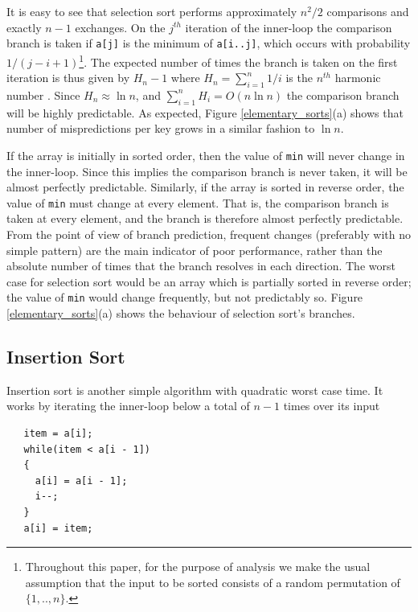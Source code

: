 \documentclass[acmtocl]{acmtrans2m}
\begin{document}
It is easy to see that selection sort performs approximately $n^2/2$ comparisons
and exactly $n - 1$ exchanges.  On the $j^{th}$ iteration of the inner-loop the
comparison branch is taken if \texttt{a[j]} is the minimum of \texttt{a[i..j]},
which occurs with probability $1 / (j - i + 1)$\footnote{Throughout this paper,
for the purpose of analysis we make the usual assumption that the input to be
sorted consists of a random permutation of $\lbrace1, .., n\rbrace$.}.  The
expected number of times the branch is taken on the first iteration is thus
given by $H_n - 1$ where $H_n = \sum_{i = 1}^n 1/i$ is the $n^{th}$ harmonic
number \cite{KnuthVol1_97}.  Since $H_n \approx \ln n$, and 
$\sum_{i = 1}^n H_i = O(n \ln n)$ the comparison branch will be highly
predictable. As expected, Figure \ref{elementary_sorts}(a) shows that number of
mispredictions per key grows in a similar fashion to $\ln n$.

If the array is initially in sorted order, then the value of \texttt{min} will
never change in the inner-loop. Since this implies the comparison branch is
never taken, it will be almost perfectly predictable. Similarly, if the array is
sorted in reverse order, the value of \texttt{min} must change at every element.
That is, the comparison branch is taken at every element, and the branch is
therefore almost perfectly predictable.  From the point of view of branch
prediction, frequent changes (preferably with no simple pattern) are the main
indicator of poor performance, rather than the absolute number of times that the
branch resolves in each direction. The worst case for selection sort would be an
array which is partially sorted in reverse order; the value of \texttt{min}
would change frequently, but not predictably so.  Figure
\ref{elementary_sorts}(a) shows the behaviour of selection sort's branches.

\subsection{Insertion Sort}
\label{insertion_sort}

Insertion sort is another simple algorithm with quadratic worst case time. It
works by iterating the inner-loop below a total of $n - 1$ times over its input

\begin{verbatim}
   item = a[i];
   while(item < a[i - 1]) 
   {
     a[i] = a[i - 1];
     i--;
   }
   a[i] = item;
\end{verbatim}
\end{document}
